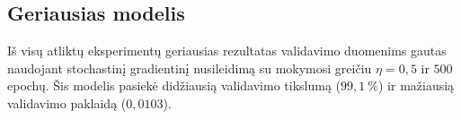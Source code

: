 \subsection{Geriausias modelis}
\label{sec:geriausias_modelis}

Iš visų atliktų eksperimentų geriausias rezultatas validavimo duomenims gautas naudojant stochastinį gradientinį nusileidimą su mokymosi greičiu $\eta = 0{,}5$ ir $500$ epochų. Šis modelis pasiekė didžiausią validavimo tikslumą ($99{,}1\ \%$) ir mažiausią validavimo paklaidą ($0{,}0103$).



